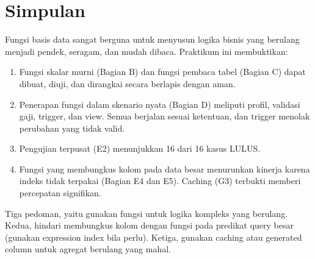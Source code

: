\documentclass[12pt,a4paper]{article}
\begin{document}
\section*{Simpulan}
Fungsi basis data sangat berguna untuk menyusun logika bisnis yang berulang menjadi pendek, seragam, dan mudah dibaca. Praktikum ini membuktikan:
\begin{enumerate}
  \item Fungsi skalar murni (Bagian B) dan fungsi pembaca tabel (Bagian C) dapat dibuat, diuji, dan dirangkai secara berlapis dengan aman.
  \item Penerapan fungsi dalam skenario nyata (Bagian D) meliputi profil, validasi gaji, trigger, dan view. Semua berjalan sesuai ketentuan, dan trigger menolak perubahan yang tidak valid.
  \item Pengujian terpusat (E2) menunjukkan 16 dari 16 kasus LULUS.
  \item Fungsi yang membungkus kolom pada data besar menurunkan kinerja karena indeks tidak terpakai (Bagian E4 dan E5). Caching (G3) terbukti memberi percepatan signifikan.
\end{enumerate}
Tiga pedoman, yaitu gunakan fungsi untuk logika kompleks yang berulang. Kedua, hindari membungkus kolom dengan fungsi pada predikat query besar (gunakan expression index bila perlu). Ketiga, gunakan caching atau generated column untuk agregat berulang yang mahal.
\end{document}
